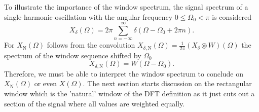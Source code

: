 \documentclass[11pt,a4paper,DIV=12]{scrartcl}
\begin{document}
To illustrate the importance of the window spectrum, the signal spectrum of a
single harmonic oscillation with the angular frequency $0\leq\Omega_0<\pi$
is considered \cite[tab.~2.3, p.~90]{Oppenheim2010}
%
\begin{equation}
X_\delta(\Omega)=2\pi\sum_{n=-\infty}^{\infty}\delta(\Omega-\Omega_0+2\pi n).
\label{eq:DTFTspec_harmSchwingung}
\end{equation}
%
For $X_\text{N}(\Omega)$ follows from the convolution
$X_{\delta,\text{N}}(\Omega)=\frac{1}{2\pi}(X_\delta\circledast W)(\Omega)$
the spectrum of the window sequence shifted by $\Omega_0$
%
\begin{equation}
X_{\delta,\text{N}}(\Omega)=W(\Omega-\Omega_0).
\end{equation}
%
Therefore, we must be able to interpret the window spectrum to conclude on
$X_\text{N}(\Omega)$ or even $X(\Omega)$.
%
The next section starts discussion on the rectangular window which is the
'natural' window of the DFT definition as it just cuts out a section of the
signal where all values are weighted equally.

\end{document}
